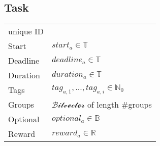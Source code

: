 \subsection{Task}
\begin{tabular}{|p{3.5cm}||p{5cm}|}
\hline
   unique ID    &  \\
   Start        & $start_a\in\mathbb{T}$ \\
   Deadline     & $deadline_a\in\mathbb{T}$ \\
   Duration  	& $duration_a\in\mathbb{T}$ \\
   Tags         & $tag_{a,1},...,tag_{a,i}\in\mathbb{N}_0$ \\	
   Groups       & $\mathcal{Bitvector}$ of length \#groups \\ 
   Optional     & $optional_a\in\mathbb{B}$\\
   Reward		& $reward_a \in \mathbb{R}$\\
\hline
\end{tabular}

